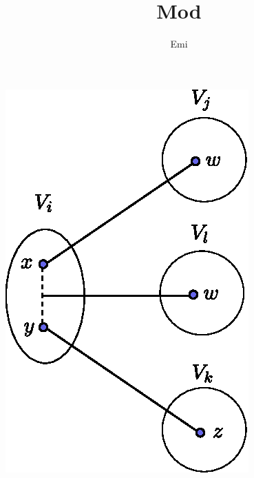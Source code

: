 \documentclass[]{article}
\title{Mod}
\author{Emi}
\begin{document}
	
	\maketitle
	\includegraphics{case3.eps}
	
\end{document}
